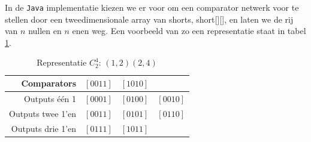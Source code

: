 \documentclass{article}
\begin{document}
In de \texttt{Java} implementatie kiezen we er voor om een comparator netwerk voor te stellen door een tweedimensionale array van shorts, short[][], en laten we de rij van $n$ nullen en $n$ enen  weg.
Een voorbeeld van zo een representatie staat in tabel \ref{tabel2}.
\begin{table}[!h]
	\centering
	\begin{tabular}{r|ccc}
	Comparators & $\left[0011\right]$ & $\left[1010\right]$ & \\ 
	\hline 
	Outputs \'e\'en 1& $\left[0001\right]$ & $\left[0100\right]$ & $\left[0010\right]$ \\ 
	\hline 
	Outputs twee 1'en &$\left[0011\right]$ & $\left[0101\right]$ & $\left[0110\right]$\\ 
	\hline 
	Outputs drie 1'en & $\left[0111\right]$ & $\left[1011\right]$ &  \\ 
	\end{tabular}
	\caption{Representatie $C^4_2$: $(1,2)(2,4)$}
	\label{tabel2}
\end{table}
\end{document}
